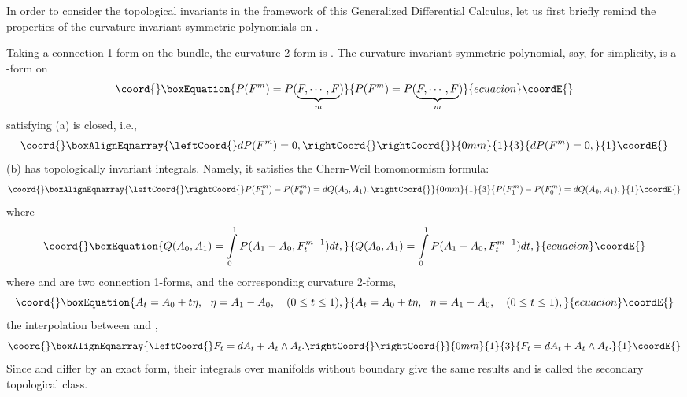 \documentclass[a4paper,twocolumn,showpacs,prd]{revtex4}
\begin{document}
 In order to consider the topological invariants
in the framework of this Generalized Differential Calculus, let us
first briefly remind the properties of the curvature invariant
symmetric polynomials on \coordHE{}.


Taking a connection 1-form \coordHE{} on the bundle, the curvature 2-form
is \coordHE{}. The curvature invariant  symmetric
polynomial, say, for simplicity, \coordHE{} is a \coordHE{}-form on \coordHE{}
\begin{equation}\coord{}\boxEquation{
P(F^m) = P(\underbrace{F,\cdots, F}_m)
}{
P(F^m) = P(\underbrace{F,\cdots, F}_m)
}{ecuacion}\coordE{}\end{equation}
satisfying (a) \coordHE{} is  closed, i.e.,
\begin{eqnarray}\coord{}\boxAlignEqnarray{\leftCoord{}
dP(F^m) = 0, \rightCoord{}
\rightCoord{}}{0mm}{1}{3}{
dP(F^m) = 0, 
}{1}\coordE{}\end{eqnarray}
(b) \coordHE{} has topologically invariant integrals.  Namely, it
satisfies the Chern-Weil homomormism formula:
\begin{eqnarray}\coord{}\boxAlignEqnarray{\leftCoord{}\rightCoord{}\label{CW} P(F^m_1) -
P(F^m_0) = dQ(A_0, A_1),
\rightCoord{}}{0mm}{1}{3}{P(F^m_1) -
P(F^m_0) = dQ(A_0, A_1),
}{1}\coordE{}\end{eqnarray} where
\begin{equation}\coord{}\boxEquation{
 Q(A_0, A_1) = \int\limits^1_0
P(A_1- A_0, F^{m-1}_t) dt,
}{
 Q(A_0, A_1) = \int\limits^1_0
P(A_1- A_0, F^{m-1}_t) dt,
}{ecuacion}\coordE{}\end{equation}
where \coordHE{} and \coordHE{} are two connection 1-forms, \coordHE{} and \coordHE{}
the corresponding curvature 2-forms,
\begin{equation}\coord{}\boxEquation{
A_t = A_0 + t\eta,~~\eta = A_1 - A_0,~~~ (0\leq t
\leq 1),
}{
A_t = A_0 + t\eta,~~\eta = A_1 - A_0,~~~ (0\leq t
\leq 1),
}{ecuacion}\coordE{}\end{equation}
 the interpolation between \coordHE{} and
\coordHE{},
\begin{eqnarray}\coord{}\boxAlignEqnarray{\leftCoord{}
F_t = dA_t + A_t \wedge A_t .\rightCoord{}
\rightCoord{}}{0mm}{1}{3}{
F_t = dA_t + A_t \wedge A_t .
}{1}\coordE{}\end{eqnarray}
Since %
\coordHE{} and \coordHE{} differ by  an exact form, their
integrals over manifolds without boundary give the same results
and \coordHE{} is called the secondary topological class.
\end{document}
